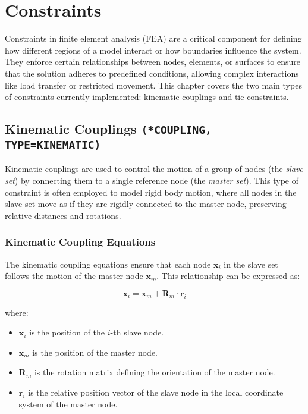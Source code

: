 \chapter{Constraints}
\label{chap:constraints}

Constraints in finite element analysis (FEA) are a critical component for defining how different regions of a model interact or how boundaries influence the system. They enforce certain relationships between nodes, elements, or surfaces to ensure that the solution adheres to predefined conditions, allowing complex interactions like load transfer or restricted movement. This chapter covers the two main types of constraints currently implemented: kinematic couplings and tie constraints.

\section{Kinematic Couplings \texttt{(*COUPLING, TYPE=KINEMATIC)}}

Kinematic couplings are used to control the motion of a group of nodes (the \textit{slave set}) by connecting them to a single reference node (the \textit{master set}). This type of constraint is often employed to model rigid body motion, where all nodes in the slave set move as if they are rigidly connected to the master node, preserving relative distances and rotations.

\subsection{Kinematic Coupling Equations}

The kinematic coupling equations ensure that each node \( \mathbf{x}_i \) in the slave set follows the motion of the master node \( \mathbf{x}_m \). This relationship can be expressed as:

\[
\mathbf{x}_i = \mathbf{x}_m + \mathbf{R}_m \cdot \mathbf{r}_i
\]

where:
\begin{itemize}
    \item \( \mathbf{x}_i \) is the position of the \( i \)-th slave node.
    \item \( \mathbf{x}_m \) is the position of the master node.
    \item \( \mathbf{R}_m \) is the rotation matrix defining the orientation of the master node.
    \item \( \mathbf{r}_i \) is the relative position vector of the slave node in the local coordinate system of the master node.
\end{itemize}

